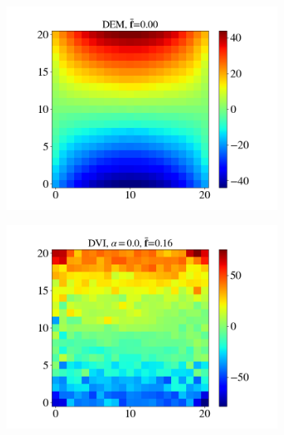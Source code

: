 \begin{itemize}
	\begin{figure}[H]
		\centering	
		\begin{subfigure}{0.32\columnwidth}	
			\centering
			\includegraphics[width=1.0\textwidth]{images/CD/Example7/20/T1_21_DEM_0.png}
		\end{subfigure}
		\begin{subfigure}{0.32\columnwidth}	
			\centering
			\includegraphics[width=1.0\textwidth]{images/CD/Example7/20/T1_21_DVI_0.0.png}
		\end{subfigure}
		\begin{subfigure}{0.32\columnwidth}	
			\centering

\end{subfigure}
\end{figure}
\end{itemize}
